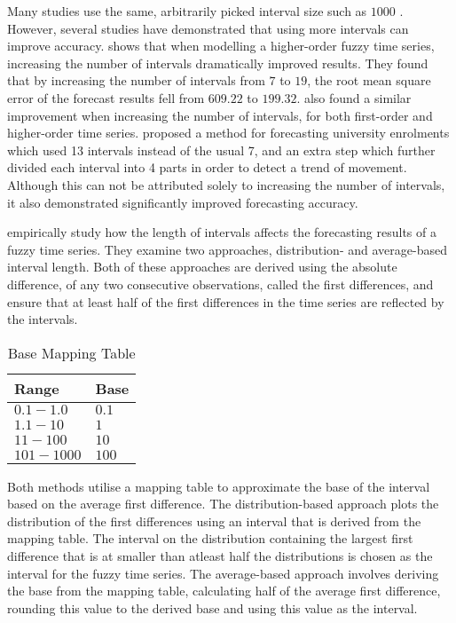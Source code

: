 \documentclass{article}
\theoremstyle{definition}
\begin{document}
Many studies use the same, arbitrarily picked interval size such as $1000$ \citep{song1993forecasting, song1994forecasting, chen1996forecasting, chen2002forecasting, chen2004new}. However, several studies have demonstrated that using more intervals can improve accuracy. \citep{chen2002forecasting} shows that when modelling a higher-order fuzzy time series, increasing the number of intervals dramatically improved results. They found that by increasing the number of intervals from $7$ to $19$, the root mean square error of the forecast results fell from $609.22$ to $199.32$. \cite{tsai1999study} also found a similar improvement when increasing the number of intervals, for both first-order and higher-order time series. \cite{chen2004new} proposed a method for forecasting university enrolments which used 13 intervals instead of the usual 7, and an extra step which further divided each interval into 4 parts in order to detect a trend of movement. Although this can not be attributed solely to increasing the number of intervals, it also demonstrated significantly improved forecasting accuracy. 

\cite{Huarng2001effective} empirically study how the length of intervals affects the forecasting results of a fuzzy time series. They examine two approaches, distribution- and average-based interval length. Both of these approaches are derived using the absolute difference, of any two consecutive observations, called the first differences, and ensure that at least half of the first differences in the time series are reflected by the intervals. 

%
\begin{table}[H]
	\center
	\begin{tabularx}{0.5\textwidth}{ X R }
  	Range & Base \\
  	\hline 
  	\noalign{\smallskip}
  	$0.1-1.0$ & $0.1$ \\
  	$1.1-10$ & $1$ \\
  	$11-100$ & $10$ \\
  	$101-1000$ & $100$ \\
	\end{tabularx}
	\caption{Base Mapping Table}
\end{table}

Both methods utilise a mapping table to approximate the base of the interval based on the average first difference. The distribution-based approach plots the distribution of the first differences using an interval that is derived from the mapping table. The interval on the distribution containing the largest first difference that is at smaller than atleast half the distributions is chosen as the interval for the fuzzy time series. The average-based approach involves deriving the base from the mapping table, calculating half of the average first difference, rounding this value to the derived base and using this value as the interval.
\end{document}

